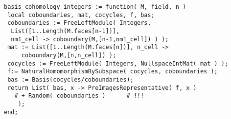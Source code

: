 \documentclass[12pt]{article}
\theoremstyle{definition}
\theoremstyle{remark}
\begin{document}
\begin{verbatim}
basis_cohomology_integers := function( M, field, n )
 local coboundaries, mat, cocycles, f, bas;
 coboundaries := FreeLeftModule( Integers, 
  List([1..Length(M.faces[n-1])], 
  nm1_cell -> coboundary(M,[n-1,nm1_cell]) ) );
 mat := List([1..Length(M.faces[n])], n_cell -> 
     coboundary(M,[n,n_cell]) );
 cocycles := FreeLeftModule( Integers, NullspaceIntMat( mat ) );
 f:= NaturalHomomorphismBySubspace( cocycles, coboundaries );
 bas := Basis(cocycles/coboundaries);
 return List( bas, x -> PreImagesRepresentative( f, x )
   # + Random( coboundaries )      # !!!
    );
end;
\end{verbatim}
\end{document}
